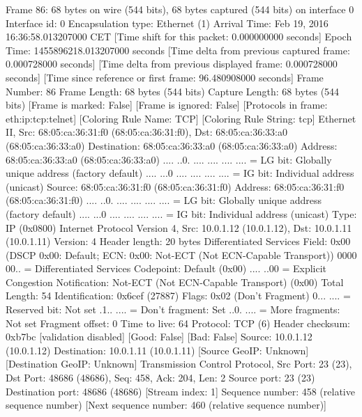 Frame 86: 68 bytes on wire (544 bits), 68 bytes captured (544 bits) on interface 0
    Interface id: 0
    Encapsulation type: Ethernet (1)
    Arrival Time: Feb 19, 2016 16:36:58.013207000 CET
    [Time shift for this packet: 0.000000000 seconds]
    Epoch Time: 1455896218.013207000 seconds
    [Time delta from previous captured frame: 0.000728000 seconds]
    [Time delta from previous displayed frame: 0.000728000 seconds]
    [Time since reference or first frame: 96.480908000 seconds]
    Frame Number: 86
    Frame Length: 68 bytes (544 bits)
    Capture Length: 68 bytes (544 bits)
    [Frame is marked: False]
    [Frame is ignored: False]
    [Protocols in frame: eth:ip:tcp:telnet]
    [Coloring Rule Name: TCP]
    [Coloring Rule String: tcp]
Ethernet II, Src: 68:05:ca:36:31:f0 (68:05:ca:36:31:f0), Dst: 68:05:ca:36:33:a0 (68:05:ca:36:33:a0)
    Destination: 68:05:ca:36:33:a0 (68:05:ca:36:33:a0)
        Address: 68:05:ca:36:33:a0 (68:05:ca:36:33:a0)
        .... ..0. .... .... .... .... = LG bit: Globally unique address (factory default)
        .... ...0 .... .... .... .... = IG bit: Individual address (unicast)
    Source: 68:05:ca:36:31:f0 (68:05:ca:36:31:f0)
        Address: 68:05:ca:36:31:f0 (68:05:ca:36:31:f0)
        .... ..0. .... .... .... .... = LG bit: Globally unique address (factory default)
        .... ...0 .... .... .... .... = IG bit: Individual address (unicast)
    Type: IP (0x0800)
Internet Protocol Version 4, Src: 10.0.1.12 (10.0.1.12), Dst: 10.0.1.11 (10.0.1.11)
    Version: 4
    Header length: 20 bytes
    Differentiated Services Field: 0x00 (DSCP 0x00: Default; ECN: 0x00: Not-ECT (Not ECN-Capable Transport))
        0000 00.. = Differentiated Services Codepoint: Default (0x00)
        .... ..00 = Explicit Congestion Notification: Not-ECT (Not ECN-Capable Transport) (0x00)
    Total Length: 54
    Identification: 0x6cef (27887)
    Flags: 0x02 (Don't Fragment)
        0... .... = Reserved bit: Not set
        .1.. .... = Don't fragment: Set
        ..0. .... = More fragments: Not set
    Fragment offset: 0
    Time to live: 64
    Protocol: TCP (6)
    Header checksum: 0xb7bc [validation disabled]
        [Good: False]
        [Bad: False]
    Source: 10.0.1.12 (10.0.1.12)
    Destination: 10.0.1.11 (10.0.1.11)
    [Source GeoIP: Unknown]
    [Destination GeoIP: Unknown]
Transmission Control Protocol, Src Port: 23 (23), Dst Port: 48686 (48686), Seq: 458, Ack: 204, Len: 2
    Source port: 23 (23)
    Destination port: 48686 (48686)
    [Stream index: 1]
    Sequence number: 458    (relative sequence number)
    [Next sequence number: 460    (relative sequence number)]

